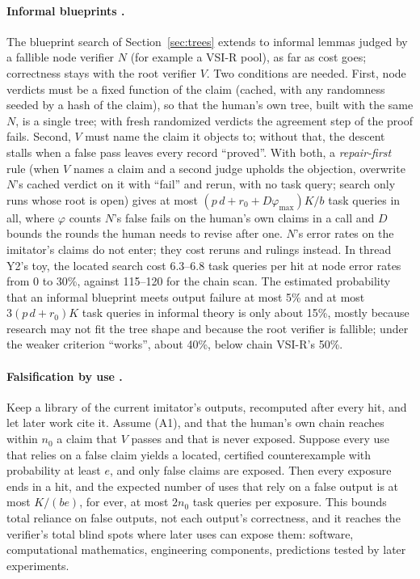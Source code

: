 \documentclass[11pt]{article}
\theoremstyle{definition}
\theoremstyle{remark}
\newcommand{\K}{K}
\begin{document}
\paragraph{Informal blueprints \cite{threadY2}.} The blueprint search of Section~\ref{sec:trees} extends to informal lemmas judged by a fallible node verifier $N$ (for example a VSI-R pool), as far as cost goes; correctness stays with the root verifier $V$. Two conditions are needed. First, node verdicts must be a fixed function of the claim (cached, with any randomness seeded by a hash of the claim), so that the human's own tree, built with the same $N$, is a single tree; with fresh randomized verdicts the agreement step of the proof fails. Second, $V$ must name the claim it objects to; without that, the descent stalls when a false pass leaves every record ``proved''. With both, a \emph{repair-first} rule (when $V$ names a claim and a second judge upholds the objection, overwrite $N$'s cached verdict on it with ``fail'' and rerun, with no task query; search only runs whose root is open) gives at most $(p\,d+r_0+D\varphi_{\max})\K/b$ task queries in all, where $\varphi$ counts $N$'s false fails on the human's own claims in a call and $D$ bounds the rounds the human needs to revise after one. $N$'s error rates on the imitator's claims do not enter; they cost reruns and rulings instead. In thread Y2's toy, the located search cost 6.3--6.8 task queries per hit at node error rates from 0 to 30\%, against 115--120 for the chain scan. The estimated probability that an informal blueprint meets output failure at most 5\% and at most $3(p\,d+r_0)\K$ task queries in informal theory is only about 15\%, mostly because research may not fit the tree shape and because the root verifier is fallible; under the weaker criterion ``works'', about 40\%, below chain VSI-R's 50\%.

\paragraph{Falsification by use \cite{threadQ2}.} Keep a library of the current imitator's outputs, recomputed after every hit, and let later work cite it. Assume (A1), and that the human's own chain reaches within $n_0$ a claim that $V$ passes and that is never exposed. Suppose every use that relies on a false claim yields a located, certified counterexample with probability at least $e$, and only false claims are exposed. Then every exposure ends in a hit, and the expected number of uses that rely on a false output is at most $\K/(be)$, for ever, at most $2n_0$ task queries per exposure. This bounds total reliance on false outputs, not each output's correctness, and it reaches the verifier's total blind spots where later uses can expose them: software, computational mathematics, engineering components, predictions tested by later experiments.
\end{document}

